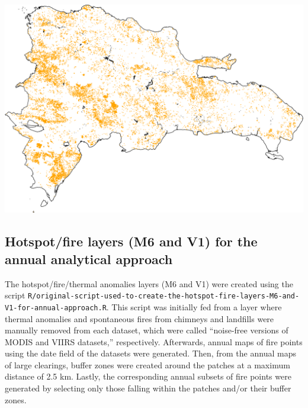 \documentclass[10pt,landscape,a3paper]{article}
\begin{document}
\begin{center}\includegraphics{img/data-download-preparation-eda/fires-m6-v1-sel2-2} \end{center}

\hypertarget{hotspotfire-layers-m6-and-v1-for-the-annual-analytical-approach}{%
\subsection{Hotspot/fire layers (M6 and V1) for the annual analytical
approach}\label{hotspotfire-layers-m6-and-v1-for-the-annual-analytical-approach}}

The hotspot/fire/thermal anomalies layers (M6 and V1) were created using
the script
\texttt{R/original-script-used-to-create-the-hotspot-fire-layers-M6-and-V1-for-annual-approach.R}.
This script was initially fed from a layer where thermal anomalies and
spontaneous fires from chimneys and landfills were manually removed from
each dataset, which were called ``noise-free versions of MODIS and VIIRS
datasets,'' respectively. Afterwards, annual maps of fire points using
the date field of the datasets were generated. Then, from the annual
maps of large clearings, buffer zones were created around the patches at
a maximum distance of 2.5 km. Lastly, the corresponding annual subsets
of fire points were generated by selecting only those falling within the
patches and/or their buffer zones.
\end{document}
